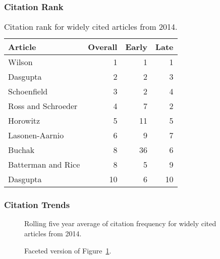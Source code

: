 \documentclass[
  10pt,
  letterpaper,
  DIV=11,
  numbers=noendperiod,
  twoside]{scrartcl}
\begin{document}
\subsubsection*{Citation Rank}\label{sec-rank-2014}

\begin{longtable}[]{@{}lrrr@{}}

\caption{\label{tbl-citation-rank-2014}Citation rank for widely cited
articles from 2014.}

\tabularnewline

\toprule\noalign{}
Article & Overall & Early & Late \\
\midrule\noalign{}
\endhead
\bottomrule\noalign{}
\endlastfoot
Wilson & 1 & 1 & 1 \\
Dasgupta & 2 & 2 & 3 \\
Schoenfield & 3 & 2 & 4 \\
Ross and Schroeder & 4 & 7 & 2 \\
Horowitz & 5 & 11 & 5 \\
Lasonen-Aarnio & 6 & 9 & 7 \\
Buchak & 8 & 36 & 6 \\
Batterman and Rice & 8 & 5 & 9 \\
Dasgupta & 10 & 6 & 10 \\

\end{longtable}

\subsubsection*{Citation Trends}\label{sec-trends-2014}

\begin{figure}


\caption{\label{fig-citation-spaghetti-2014}Rolling five year average of
citation frequency for widely cited articles from 2014.}

\end{figure}%

\begin{figure}


\caption{\label{fig-citation-facet-2014}Faceted version of
Figure~\ref{fig-citation-spaghetti-2014}.}

\end{figure}%
\end{document}
